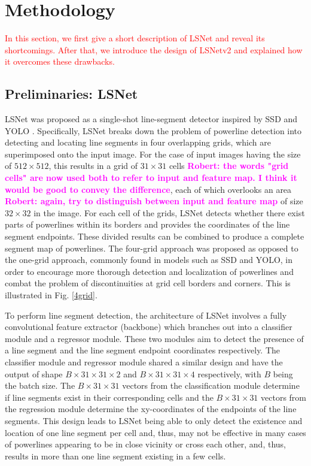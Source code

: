 \documentclass[journal]{IEEEtran}
\newcommand{\commentR}[1]{\textbf{\textcolor{magenta}{Robert: #1}}}
\newcommand{\textK}[1]{\textcolor{red}{#1}}
\begin{document}
\section{Methodology}

\textK{In this section, we first give a short description of LSNet and reveal its shortcomings. After that, we introduce the design of LSNetv2 and explained how it overcomes these drawbacks.}

\subsection{Preliminaries: LSNet}
LSNet \cite{Nguyen2020} was proposed as a single-shot line-segment detector inspired by SSD \cite{SSD} and YOLO \cite{YOLO}. Specifically, LSNet breaks down the problem of powerline detection into detecting and locating line segments in four overlapping grids, which are superimposed onto the input image. For the case of input images having the size of $512 \times 512$, this results in a grid of $31 \times 31$ cells \commentR{the words "grid cells" are now used both to refer to input and feature map. I think it would be good to convey the difference}, each of which overlooks an area \commentR{again, try to distinguish between input and feature map} of size $32 \times 32$ in the image. For each cell of the grids,  LSNet detects whether there exist parts of powerlines within its borders and provides the coordinates of the line segment endpoints. These divided results can be combined to produce a complete segment map of powerlines. The four-grid approach was proposed as opposed to the one-grid approach, commonly found in models such as SSD and YOLO, in order to encourage more thorough detection and localization of powerlines and combat the problem of discontinuities at grid cell borders and corners. This is illustrated in Fig. \ref{4grid}. 

To perform line segment detection, the architecture of LSNet involves a fully convolutional feature extractor (backbone) which branches out into a classifier module and a regressor module. These two modules aim to detect the presence of a line segment and the line segment endpoint coordinates respectively. The classifier module and regressor module shared a similar design and have the output of shape $B \times 31 \times 31 \times 2$ and $B \times 31 \times 31 \times 4$ respectively, with $B$ being the batch size. The $B \times 31 \times 31$ vectors from the classification module determine if line segments exist in their corresponding cells and the $B \times 31 \times 31$ vectors from the regression module determine the xy-coordinates of the endpoints of the line segments. This design leads to LSNet being able to only detect the existence and location of one line segment per cell and, thus, may not be effective in many cases of powerlines appearing to be in close vicinity or cross each other, and, thus, results in more than one line segment existing in a few cells. 
\end{document}
